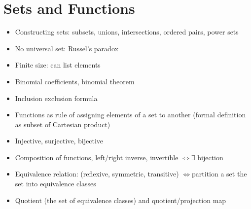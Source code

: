 \section{Sets and Functions}
\begin{itemize}
      \item Constructing sets: subsets, unions, intersections, ordered pairs,
            power sets
      \item No universal set: Russel's paradox
      \item Finite size: can list elements
      \item Binomial coefficients, binomial theorem
      \item Inclusion exclusion formula
      \item Functions as rule of assigning elements of a set to another (formal
            definition as subset of Cartesian product)
      \item Injective, surjective, bijective
      \item Composition of functions, left/right inverse, invertible $\iff\exists$
            bijection
      \item Equivalence relation: (reflexive, symmetric, transitive) $\iff$partition a set
            the set into equivalence classes
      \item Quotient (the set of equivalence classes) and quotient/projection map
\end{itemize}

